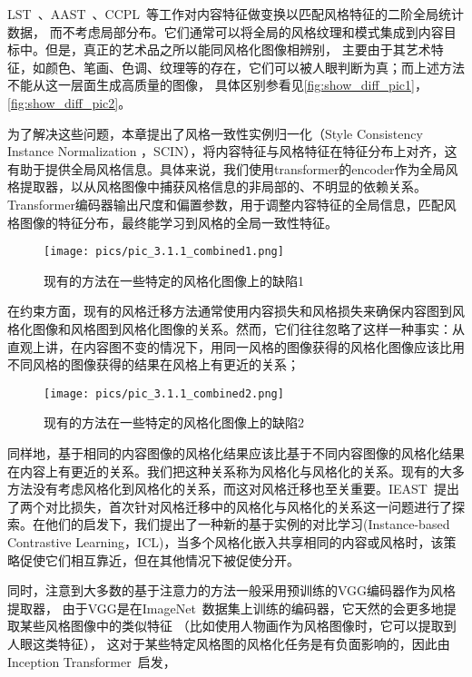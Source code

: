 LST~\cite{li2019learning}、AAST~\cite{hu2020aesthetic}、CCPL~\cite{wu2022ccpl}等工作对内容特征做变换以匹配风格特征的二阶全局统计数据，
而不考虑局部分布。它们通常可以将全局的风格纹理和模式集成到内容目标中。但是，真正的艺术品之所以能同风格化图像相辨别，
主要由于其艺术特征，如颜色、笔画、色调、纹理等的存在，它们可以被人眼判断为真；而上述方法不能从这一层面生成高质量的图像，
具体区别参看见\autoref{fig:show_diff_pic1}，\autoref{fig:show_diff_pic2}。
\par 为了解决这些问题，本章提出了风格一致性实例归一化（Style Consistency Instance Normalization ，SCIN），将内容特征与风格特征在特征分布上对齐，这有助于提供全局风格信息。具体来说，我们使用transformer的encoder作为全局风格提取器，以从风格图像中捕获风格信息的非局部的、不明显的依赖关系。Transformer编码器输出尺度和偏置参数，用于调整内容特征的全局信息，匹配风格图像的特征分布，最终能学习到风格的全局一致性特征。
\begin{figure}[htbp]
    \centering
    \texttt{[image: pics/pic\_3.1.1\_combined1.png]}
    \caption{\label{fig:show_diff_pic1}现有的方法在一些特定的风格化图像上的缺陷1}
\end{figure}
\par 在约束方面，现有的风格迁移方法通常使用内容损失和风格损失来确保内容图到风格化图像和风格图到风格化图像的关系。然而，它们往往忽略了这样一种事实：从直观上讲，在内容图不变的情况下，用同一风格的图像获得的风格化图像应该比用不同风格的图像获得的结果在风格上有更近的关系；
\begin{figure}[htbp]
    \centering
    \texttt{[image: pics/pic\_3.1.1\_combined2.png]}
    \caption{\label{fig:show_diff_pic2}现有的方法在一些特定的风格化图像上的缺陷2}
\end{figure}同样地，基于相同的内容图像的风格化结果应该比基于不同内容图像的风格化结果在内容上有更近的关系。我们把这种关系称为风格化与风格化的关系。现有的大多方法没有考虑风格化到风格化的关系，而这对风格迁移也至关重要。IEAST~\cite{chen2021artistic}提出了两个对比损失，首次针对风格迁移中的风格化与风格化的关系这一问题进行了探索。在他们的启发下，我们提出了一种新的基于实例的对比学习(Instance-based Contrastive Learning，ICL)，当多个风格化嵌入共享相同的内容或风格时，该策略促使它们相互靠近，但在其他情况下被促使分开。
\par 同时，注意到大多数的基于注意力的方法一般采用预训练的VGG编码器作为风格提取器，
由于VGG是在ImageNet~\cite{deng2009imagenet}数据集上训练的编码器，它天然的会更多地提取某些风格图像中的类似特征
（比如使用人物画作为风格图像时，它可以提取到人眼这类特征），
这对于某些特定风格图的风格化任务是有负面影响的，因此由Inception Transformer~\cite{si2022inception}启发，
